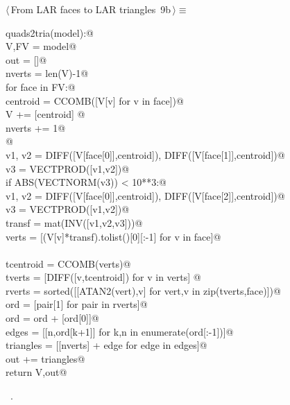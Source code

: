 \documentclass[11pt,oneside]{article}	%
\begin{document}
\begin{flushleft} \small \label{scrap10}
\protect{}$\langle\,$From LAR faces to LAR triangles\nobreak\ {\footnotesize 9b}$\,\rangle\equiv$
\vspace{-1ex}
\begin{list}{}{} \item
\mbox{}\verb@def quads2tria(model):@\\
\mbox{}\verb@   V,FV = model@\\
\mbox{}\verb@   out = []@\\
\mbox{}\verb@   nverts = len(V)-1@\\
\mbox{}\verb@   for face in FV:@\\
\mbox{}\verb@      centroid = CCOMB([V[v] for v in face])@\\
\mbox{}\verb@      V += [centroid] @\\
\mbox{}\verb@      nverts += 1@\\
\mbox{}\verb@      @\\
\mbox{}\verb@      v1, v2 = DIFF([V[face[0]],centroid]), DIFF([V[face[1]],centroid])@\\
\mbox{}\verb@      v3 = VECTPROD([v1,v2])@\\
\mbox{}\verb@      if ABS(VECTNORM(v3)) < 10**3:@\\
\mbox{}\verb@         v1, v2 = DIFF([V[face[0]],centroid]), DIFF([V[face[2]],centroid])@\\
\mbox{}\verb@         v3 = VECTPROD([v1,v2])@\\
\mbox{}\verb@      transf = mat(INV([v1,v2,v3]))@\\
\mbox{}\verb@      verts = [(V[v]*transf).tolist()[0][:-1]  for v in face]@\\
\mbox{}\verb@@\\
\mbox{}\verb@      tcentroid = CCOMB(verts)@\\
\mbox{}\verb@      tverts = [DIFF([v,tcentroid]) for v in verts]   @\\
\mbox{}\verb@      rverts = sorted([[ATAN2(vert),v] for vert,v in zip(tverts,face)])@\\
\mbox{}\verb@      ord = [pair[1] for pair in rverts]@\\
\mbox{}\verb@      ord = ord + [ord[0]]@\\
\mbox{}\verb@      edges = [[n,ord[k+1]] for k,n in enumerate(ord[:-1])]@\\
\mbox{}\verb@      triangles = [[nverts] + edge for edge in edges]@\\
\mbox{}\verb@      out += triangles@\\
\mbox{}\verb@   return V,out@\\
\mbox{}\verb@@{\NWsep}
\end{list}
\vspace{-1ex}
\footnotesize\addtolength{\baselineskip}{-1ex}
\begin{list}{}{\setlength{\itemsep}{-\parsep}\setlength{\itemindent}{-\leftmargin}}
\item \NWtxtMacroRefIn\ .
\end{list}
\end{flushleft}
\end{document}
